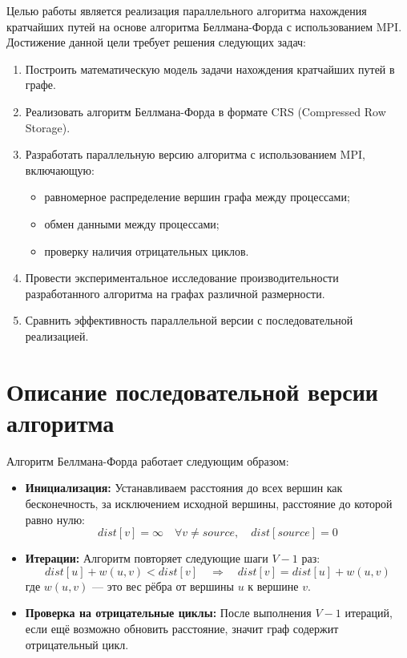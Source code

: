 \documentclass[12pt]{article}
\begin{document}
Целью работы является реализация параллельного алгоритма нахождения кратчайших путей на основе алгоритма Беллмана-Форда с использованием MPI.
Достижение данной цели требует решения следующих задач:
\begin{enumerate}
    \item Построить математическую модель задачи нахождения кратчайших путей в графе.
    \item Реализовать алгоритм Беллмана-Форда в формате CRS (Compressed Row Storage).
    \item Разработать параллельную версию алгоритма с использованием MPI, включающую:
    \begin{itemize}
        \item равномерное распределение вершин графа между процессами;
        \item обмен данными между процессами;
        \item проверку наличия отрицательных циклов.
    \end{itemize}
    \item Провести экспериментальное исследование производительности разработанного алгоритма на графах различной размерности.
    \item Сравнить эффективность параллельной версии с последовательной реализацией.
\end{enumerate}

\section{Описание последовательной версии алгоритма}

Алгоритм Беллмана-Форда работает следующим образом:

\begin{itemize}
    \item \textbf{Инициализация:} Устанавливаем расстояния до всех вершин как бесконечность, за исключением исходной вершины, расстояние до которой равно нулю:
    \[
    dist[v] = \infty \quad \forall v \neq source, \quad dist[source] = 0
    \]
    
    \item \textbf{Итерации:} Алгоритм повторяет следующие шаги \(V-1\) раз:
    \[
    dist[u] + w(u, v) < dist[v] \quad \Rightarrow \quad dist[v] = dist[u] + w(u, v)
    \]
    где \(w(u, v)\) — это вес рёбра от вершины \(u\) к вершине \(v\).
    
    \item \textbf{Проверка на отрицательные циклы:} После выполнения \(V-1\) итераций, если ещё возможно обновить расстояние, значит граф содержит отрицательный цикл.
\end{itemize}
\end{document}
